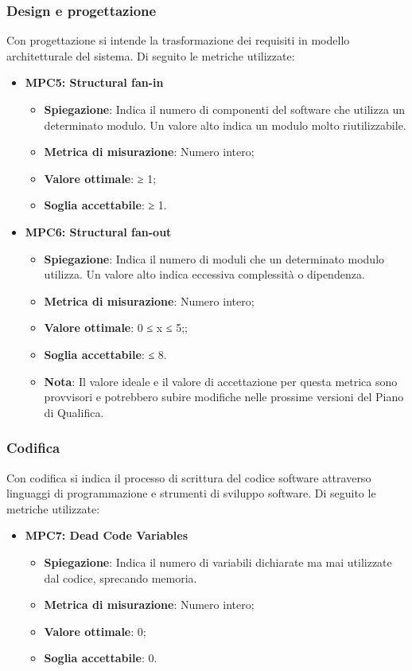 \subsubsection{Design e progettazione}
Con progettazione si intende la trasformazione dei requisiti in modello architetturale del sistema. Di seguito le metriche utilizzate:
\begin{itemize}
    \item \textbf{MPC5: Structural fan-in}
    \begin{itemize}
        \item \textbf{Spiegazione}: Indica il numero di componenti del software che utilizza un determinato modulo. Un valore alto indica un modulo molto riutilizzabile.
        \item \textbf{Metrica di misurazione}: Numero intero;
        \item \textbf{Valore ottimale}: ≥ 1;
        \item \textbf{Soglia accettabile}: ≥ 1.
    \end{itemize}

    \item \textbf{MPC6: Structural fan-out}
    \begin{itemize}
        \item \textbf{Spiegazione}: Indica il numero di moduli che un determinato modulo utilizza. Un valore alto indica eccessiva complessità o dipendenza.
        \item \textbf{Metrica di misurazione}: Numero intero;
        \item \textbf{Valore ottimale}: 0 ≤ x ≤ 5;; 
        \item \textbf{Soglia accettabile}: ≤ 8. 
        \item \textbf{Nota}: Il valore ideale e il valore di accettazione per questa metrica sono provvisori e potrebbero subire modifiche nelle prossime versioni del Piano di Qualifica.
    \end{itemize}
\end{itemize}

\subsubsection{Codifica}
Con codifica si indica il processo di scrittura del codice software attraverso linguaggi di programmazione e strumenti di sviluppo software. Di seguito le metriche utilizzate:
\begin{itemize}
    \item \textbf{MPC7: Dead Code Variables}
    \begin{itemize}
        \item \textbf{Spiegazione}: Indica il numero di variabili dichiarate ma mai utilizzate dal codice, sprecando memoria.
        \item \textbf{Metrica di misurazione}: Numero intero;
        \item \textbf{Valore ottimale}: 0;
        \item \textbf{Soglia accettabile}: 0.
    \end{itemize}
\end{itemize}


